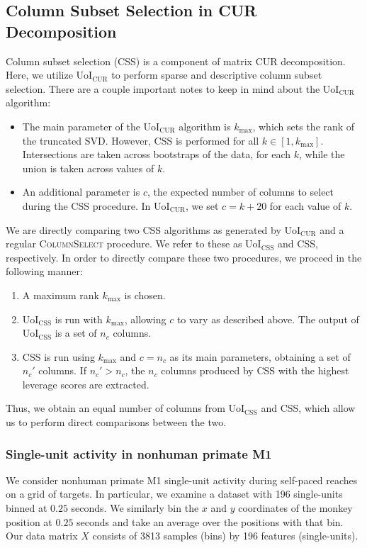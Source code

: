 \documentclass[11pt]{article}
\begin{document}
\subsection{Column Subset Selection in CUR Decomposition}
Column subset selection (CSS) is a component of matrix CUR decomposition. Here, we utilize UoI$_{\text{CUR}}$ to perform sparse and descriptive column subset selection. There are a couple important notes to keep in mind about the UoI$_{\text{CUR}}$ algorithm: 
\begin{itemize}
	\item The main parameter of the UoI$_{\text{CUR}}$ algorithm is $k_{\text{max}}$, which sets the rank of the truncated SVD. However, CSS is performed for all $k \in \left[1, k_{\text{max}}\right]$. Intersections are taken across bootstraps of the data, for each $k$, while the union is taken across values of $k$. 
	\item An additional parameter is $c$, the expected number of columns to select during the CSS procedure. In UoI$_{\text{CUR}}$, we set $c=k+20$ for each value of $k$.
\end{itemize}
We are directly comparing two CSS algorithms as generated by UoI$_{\text{CUR}}$ and a regular \textsc{ColumnSelect} procedure. We refer to these as UoI$_{\text{CSS}}$ and CSS, respectively. In order to directly compare these two procedures, we proceed in the following manner:
\begin{enumerate}[label=\textbf{(\arabic*)}]
	\item A maximum rank $k_{\text{max}}$ is chosen.
	\item UoI$_{\text{CSS}}$ is run with $k_{\text{max}}$, allowing $c$ to vary as described above. The output of UoI$_{\text{CSS}}$ is a set of $n_c$ columns.
	\item CSS is run using $k_{\text{max}}$ and $c=n_c$ as its main parameters, obtaining a set of $n_c'$ columns. If $n_c' > n_c$, the $n_c$ columns produced by CSS with the highest leverage scores are extracted.
\end{enumerate}
Thus, we obtain an equal number of columns from UoI$_{\text{CSS}}$ and CSS, which allow us to perform direct comparisons between the two.

\subsubsection{Single-unit activity in nonhuman primate M1}
We consider nonhuman primate M1 single-unit activity during self-paced reaches on a grid of targets. In particular, we examine a dataset with 196 single-units binned at $0.25$ seconds. We similarly bin the $x$ and $y$ coordinates of the monkey position at $0.25$ seconds and take an average over the positions with that bin. Our data matrix $X$ consists of 3813 samples (bins) by 196 features (single-units).
\end{document}
